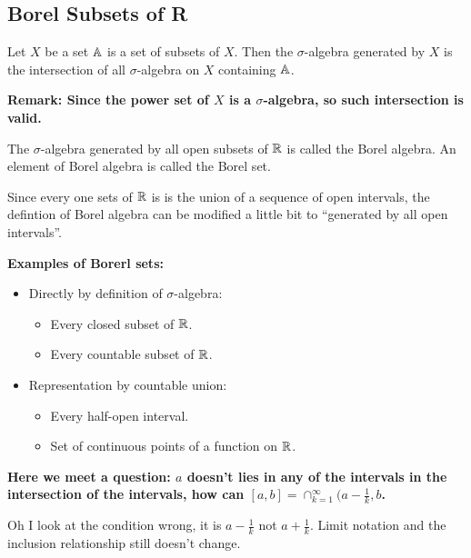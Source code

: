 \documentclass[11pt]{article}
\begin{document}
\subsection{Borel Subsets of R}
\label{sec:org6edaa26}

\begin{definition}
Let \(X\) be a set \(\mathbb{A}\) is a set of subsets of \(X\). Then the \(\sigma\)-algebra generated by \(X\) is the intersection of all \(\sigma\)-algebra on \(X\) containing \(\mathbb{A}\).
\end{definition}

\textbf{Remark: Since the power set of \(X\) is a \(\sigma\)-algebra, so such intersection is valid.}

\begin{definition}
The \(\sigma\)-algebra generated by all open subsets of \(\mathbb{R}\) is called the Borel algebra. An element of Borel algebra is called the Borel set.
\end{definition}

Since every one sets of \(\mathbb{R}\) is is the union of a sequence of open intervals, the defintion of Borel algebra can be modified a little bit to ``generated by all open intervals''.

\textbf{Examples of Borerl sets:}
\begin{itemize}
\item Directly by definition of \(\sigma\)-algebra:
\begin{itemize}
\item Every closed subset of \(\mathbb{R}\).
\item Every countable subset of \(\mathbb{R}\).
\end{itemize}
\item Representation by countable union:
\begin{itemize}
\item Every half-open interval.
\item Set of continuous points of a function on \(\mathbb{R}\).
\end{itemize}
\end{itemize}

\textbf{Here we meet a question: \(a\) doesn't lies in any of the intervals in the intersection of the intervals, how can \([a,b] = \cap^{\infty}_{k = 1}(a-\frac{1}{k}, b\).}

Oh I look at the condition wrong, it is \(a-\frac{1}{k}\) not \(a + \frac{1}{k}\). Limit notation and the inclusion relationship still doesn't change.
\end{document}
